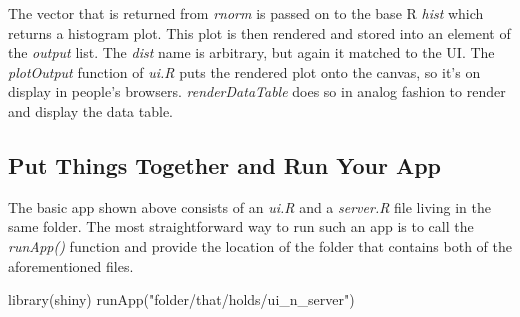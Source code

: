 \documentclass[
  12pt,
  letterpaper,
]{krantz}
\newenvironment{Shaded}{\begin{snugshade}}{\end{snugshade}}
\newcommand{\AttributeTok}[1]{\textcolor[rgb]{0.40,0.45,0.13}{#1}}
\newcommand{\ControlFlowTok}[1]{\textcolor[rgb]{0.00,0.23,0.31}{#1}}
\newcommand{\FunctionTok}[1]{\textcolor[rgb]{0.28,0.35,0.67}{#1}}
\newcommand{\NormalTok}[1]{\textcolor[rgb]{0.00,0.23,0.31}{#1}}
\newcommand{\OtherTok}[1]{\textcolor[rgb]{0.00,0.23,0.31}{#1}}
\newcommand{\SpecialCharTok}[1]{\textcolor[rgb]{0.37,0.37,0.37}{#1}}
\newcommand{\StringTok}[1]{\textcolor[rgb]{0.13,0.47,0.30}{#1}}
\begin{document}
\begin{Shaded}
\end{Shaded}

The vector that is returned from \emph{rnorm} is passed on to the base R
\emph{hist} which returns a histogram plot. This plot is then rendered
and stored into an element of the \emph{output} list. The \emph{dist}
name is arbitrary, but again it matched to the UI. The \emph{plotOutput}
function of \emph{ui.R} puts the rendered plot onto the canvas, so it's
on display in people's browsers. \emph{renderDataTable} does so in
analog fashion to render and display the data table.

\hypertarget{put-things-together-and-run-your-app}{%
\subsection{Put Things Together and Run Your
App}\label{put-things-together-and-run-your-app}}

The basic app shown above consists of an \emph{ui.R} and a
\emph{server.R} file living in the same folder. The most straightforward
way to run such an app is to call the \emph{runApp()} function and
provide the location of the folder that contains both of the
aforementioned files.

\begin{Shaded}
\begin{Highlighting}[]
\FunctionTok{library}\NormalTok{(shiny)}
\FunctionTok{runApp}\NormalTok{(}\StringTok{"folder/that/holds/ui\_n\_server"}\NormalTok{)}
\end{Highlighting}
\end{Shaded}
\end{document}
